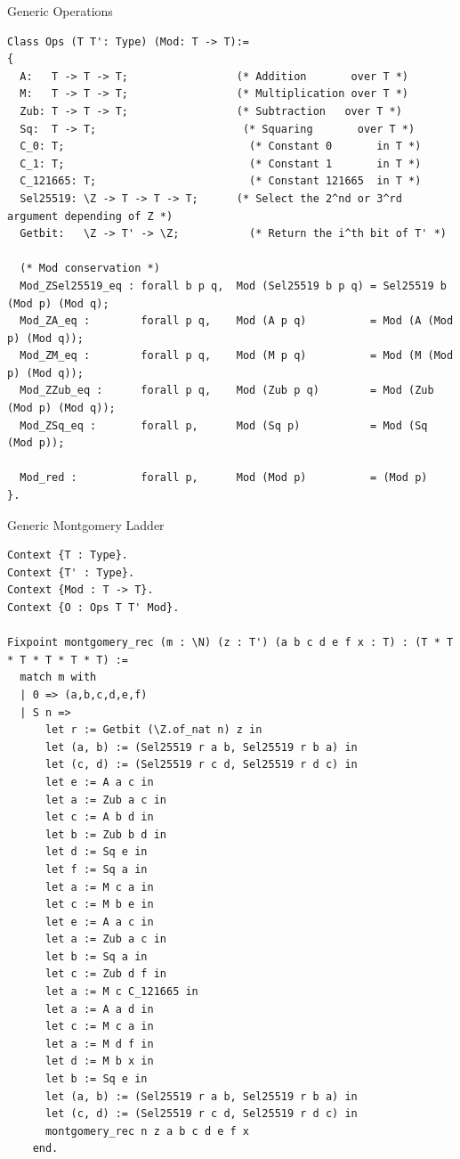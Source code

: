 \documentclass[8pt,aspectratio=169]{beamer}
\begin{document}
%
%
\begin{frame}[fragile]{Generic Operations}
\begin{center}

\begin{lstlisting}[language=Coq]
Class Ops (T T': Type) (Mod: T -> T):=
{
  A:   T -> T -> T;                 (* Addition       over T *)
  M:   T -> T -> T;                 (* Multiplication over T *)
  Zub: T -> T -> T;                 (* Subtraction   over T *)
  Sq:  T -> T;                       (* Squaring       over T *)
  C_0: T;                             (* Constant 0       in T *)
  C_1: T;                             (* Constant 1       in T *)
  C_121665: T;                        (* Constant 121665  in T *)
  Sel25519: \Z -> T -> T -> T;      (* Select the 2^nd or 3^rd argument depending of Z *)
  Getbit:   \Z -> T' -> \Z;           (* Return the i^th bit of T' *)

  (* Mod conservation *)
  Mod_ZSel25519_eq : forall b p q,  Mod (Sel25519 b p q) = Sel25519 b (Mod p) (Mod q);
  Mod_ZA_eq :        forall p q,    Mod (A p q)          = Mod (A (Mod p) (Mod q));
  Mod_ZM_eq :        forall p q,    Mod (M p q)          = Mod (M (Mod p) (Mod q));
  Mod_ZZub_eq :      forall p q,    Mod (Zub p q)        = Mod (Zub (Mod p) (Mod q));
  Mod_ZSq_eq :       forall p,      Mod (Sq p)           = Mod (Sq (Mod p));

  Mod_red :          forall p,      Mod (Mod p)          = (Mod p)
}.
\end{lstlisting}
\end{center}
\end{frame}


%
%
\begin{frame}[fragile]{Generic Montgomery Ladder}
\begin{center}
\begin{lstlisting}[language=Coq]
Context {T : Type}.
Context {T' : Type}.
Context {Mod : T -> T}.
Context {O : Ops T T' Mod}.

Fixpoint montgomery_rec (m : \N) (z : T') (a b c d e f x : T) : (T * T * T * T * T * T) :=
  match m with
  | 0 => (a,b,c,d,e,f)
  | S n =>
      let r := Getbit (\Z.of_nat n) z in
      let (a, b) := (Sel25519 r a b, Sel25519 r b a) in
      let (c, d) := (Sel25519 r c d, Sel25519 r d c) in
      let e := A a c in
      let a := Zub a c in
      let c := A b d in
      let b := Zub b d in
      let d := Sq e in
      let f := Sq a in
      let a := M c a in
      let c := M b e in
      let e := A a c in
      let a := Zub a c in
      let b := Sq a in
      let c := Zub d f in
      let a := M c C_121665 in
      let a := A a d in
      let c := M c a in
      let a := M d f in
      let d := M b x in
      let b := Sq e in
      let (a, b) := (Sel25519 r a b, Sel25519 r b a) in
      let (c, d) := (Sel25519 r c d, Sel25519 r d c) in
      montgomery_rec n z a b c d e f x
    end.
\end{lstlisting}
\end{center}
\end{frame}
\end{document}
